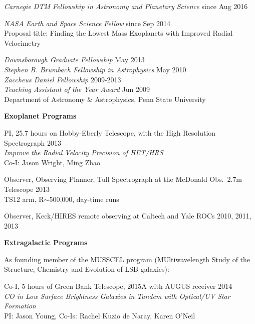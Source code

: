 \begin{small}


{\sl Carnegie DTM Fellowship in Astronomy and Planetary Science} \hfill     since Aug 2016 
\vspace{10pt}

{\sl NASA Earth and Space Science Fellow} \hfill     since Sep 2014 \\
Proposal title: Finding the Lowest Mass Exoplanets with Improved
Radial Velocimetry
\vspace{10pt}

{\sl Downsborough Graduate Fellowship} \hfill        May 2013 \\
{\sl Stephen B. Brumbach Fellowship in Astrophysics} \hfill        May 2010 \\
{\sl Zaccheus Daniel Fellowship} \hfill        2009-2013 \\
{\sl Teaching Assistant of the Year Award} \hfill        Jun 2009 \\
Department of Astronomy \& Astrophysics, Penn State University

   
\newpage
{} 


{\bf Exoplanet Programs}

PI, 25.7 hours on Hobby-Eberly Telescope, with the High Resolution Spectrograph \hfill 2013 \\
{\it Improve the Radial Velocity Precision of HET/HRS}\\
Co-I: Jason Wright, Ming Zhao
\vspace{10pt}

Observer, Observing Planner, Tull Spectrograph at the McDonald Obs.\ 2.7m
Telescope \hfill 2013\\
TS12 arm, R$\sim$500,000, day-time runs
\vspace{10pt}

Observer, Keck/HIRES remote observing at Caltech and Yale ROCs \hfill 2010, 2011, 2013\\
\vspace{10pt}

{\bf Extragalactic Programs}

As founding member of the MUSSCEL program (MUltiwavelength Study of the
Structure, Chemistry and Evolution of LSB galaxies):
\vspace{10pt}

Co-I, 5 hours of Green Bank Telescope, 2015A with AUGUS receiver
\hfill 2014 \\
{\it CO in Low Surface Brightness Galaxies in Tandem with Optical/UV Star Formation}\\
PI: Jason Young, Co-Is: Rachel Kuzio de Naray, Karen O'Neil
\vspace{10pt}


\end{small}

